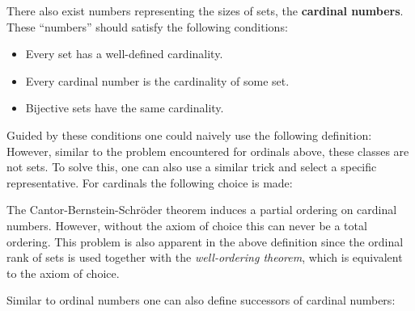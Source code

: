     There also exist numbers representing the sizes of sets, the \textbf{cardinal numbers}. These ``numbers'' should satisfy the following conditions:
    \begin{itemize}
        \item Every set has a well-defined cardinality.
        \item Every cardinal number is the cardinality of some set.
        \item Bijective sets have the same cardinality.
    \end{itemize}
    Guided by these conditions one could naively use the following definition:
    However, similar to the problem encountered for ordinals above, these classes are not sets. To solve this, one can also use a similar trick and select a specific representative. For cardinals the following choice is made:

    \begin{remark}[Ordering]
        The Cantor-Bernstein-Schr\"oder theorem induces a partial ordering on cardinal numbers. However, without the axiom of choice this can never be a total ordering. This problem is also apparent in the above definition since the ordinal rank of sets is used together with the \textit{well-ordering theorem}, which is equivalent to the axiom of choice.
    \end{remark}

    Similar to ordinal numbers one can also define successors of cardinal numbers:


